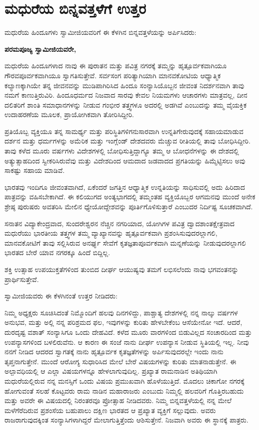 
\chapter{ಮಧುರೆಯ ಬಿನ್ನವತ್ತಳೆಗೆ ಉತ್ತರ}

ಮಧುರೆಯ ಹಿಂದೂಗಳು ಸ್ವಾಮೀಜಿಯವರಿಗೆ ಈ ಕೆಳಗಿನ ಬಿನ್ನವತ್ತಳೆಯನ್ನು ಅರ್ಪಿಸಿದರು:

\textbf{ಪರಮಪೂಜ್ಯ ಸ್ವಾಮೀಜಿಯವರೇ, }

ಮಧುರೆಯ ಹಿಂದೂಗಳಾದ ನಾವು ಈ ಪುರಾತನ ಮತ್ತು ಪವಿತ್ರ ನಗರಕ್ಕೆ ತಮ್ಮನ್ನು ಹೃತ್ಪೂರ್ವಕವಾಗಿಯೂ ಗೌರವಪೂರ್ವಕವಾಗಿಯೂ ಸ್ವಾಗತಿಸುತ್ತೇವೆ. ಸರ್ವಸಂಗ ಪರಿತ್ಯಾಗಿಯಾಗಿ ಮಾನವಕೋಟಿಯ ಆಧ್ಯಾತ್ಮಿಕ ಕಲ್ಯಾಣಕ್ಕಾಗಿಯೇ ತನ್ನ ಜೀವನವನ್ನು ಮುಡಿಪಾಗಿರಿಸಿದ ಹಿಂದೂ ಸಂನ್ಯಾಸಿಯೊಬ್ಬನ ಜೀವಂತ ನಿದರ್ಶನವಾಗಿ ತಾವು ನಮಗೆ ಕಾಣುತ್ತಿರುವಿರಿ. ಹಿಂದೂಧರ್ಮದ ನಿಜವಾದ ಸಾರವು ಕೇವಲ ನಿಯಮಗಳು ಆಚಾರಗಳು ಮಾತ್ರವಲ್ಲ, ದೀನ ದಲಿತರಿಗೆ ಶಾಂತಿ ಸಮಾಧಾನಗಳನ್ನು ನೀಡುವ ಗಂಭೀರ ತತ್ತ್ವಗಳೂ ಅದರಲ್ಲಿ ಅಡಗಿವೆ ಎಂಬುದನ್ನು ತಮ್ಮ ವೈಯಕ್ತಿಕ ಉದಾಹರಣೆಯ ಮೂಲಕ, ಪ್ರಾಯೋಗಿಕವಾಗಿ ತೋರಿಸಿದ್ದೀರಿ. 

ಪ್ರತಿಯೊಬ್ಬ ವ್ಯಕ್ತಿಯೂ ತನ್ನ ಸಾಮರ್ಥ್ಯ ಮತ್ತು ಪರಿಸ್ಥಿತಿಗಳಿಗನುಸಾರವಾಗಿ ಉನ್ನತಿಗೇರುವುದಕ್ಕೆ ಸಹಾಯಮಾಡುವ ದರ್ಶನ ಮತ್ತು ಧರ್ಮಗಳನ್ನು ಅಮೆರಿಕ ಮತ್ತು ಇಂಗ್ಲೆಂಡ್​ ದೇಶದವರು ಮೆಚ್ಚುವ ರೀತಿಯಲ್ಲಿ ತಾವು ಬೋಧಿಸಿದ್ದೀರಿ. ತಾವು ಕಳೆದ ಮೂರು ವರ್ಷಗಳು ವಿದೇಶಗಳಲ್ಲಿ ಬೋಧಿಸುತ್ತಿದ್ದಾಗ್ಯೂ ತಮ್ಮ ಆ ಬೋಧನೆ\-ಗಳನ್ನು ಈ ದೇಶದಲ್ಲಿ ಅತ್ಯುತ್ಸಾಹದಿಂದ ಸ್ವೀಕರಿಸಿರುವೆವು ಮತ್ತು ವಿದೇಶದಿಂದ ಆಮದಾದ ಜಡವಾದದ ಪ್ರಗತಿಯನ್ನು ಹಿಮ್ಮೆಟ್ಟಿಸಲು ಅವು ಸಾಕಷ್ಟು ಸಹಾಯ ಮಾಡಿವೆ. 

ಭಾರತವು ಇಂದಿಗೂ ಜೀವಂತವಾಗಿದೆ, ಏಕೆಂದರೆ ಜಗತ್ತಿನ ಆಧ್ಯಾತ್ಮಿಕ ಉನ್ನತಿಯನ್ನು ಸಾಧಿಸುವಲ್ಲಿ ಅದು ಹಿರಿದಾದ ಪಾತ್ರವನ್ನು ವಹಿಸಬೇಕಾಗಿದೆ. ಈ ಕಲಿಯುಗದ ಅಂತ್ಯಭಾಗದಲ್ಲಿ ತಮ್ಮಂತಹ ವ್ಯಕ್ತಿಯೊಬ್ಬರ ಆಗಮನವು ಮುಂದೆ ಅನೇಕ ಶ್ರೇಷ್ಠ ಪುರುಷರು ಅವತರಿಸಿ ಮೇಲಿನ ಧ್ಯೇಯೋದ್ದೇಶವನ್ನು ಪೂರ್ತಿಗೊಳಿಸುತ್ತಾರೆ ಎಂಬುದರ ನಿರ್ದಿಷ್ಟ ಸೂಚಕವಾಗಿದೆ. 

ಸನಾತನ ವಿದ್ಯಾಕೇಂದ್ರವಾದ, ಸುಂದರೇಶ್ವರನ ನೆಚ್ಚಿನ ನಗರಿಯಾದ, ಯೋಗಿಗಳ ಪವಿತ್ರ ದ್ವಾದಶಾಂತಕ್ಷೇತ್ರವಾದ ಮಧುರೆಯು ಭಾರತೀಯ ತತ್ತ್ವಗಳ ತಮ್ಮ ವ್ಯಾಖ್ಯಾನವನ್ನು ಹೃತ್ಪೂರ್ವಕವಾಗಿ ಪ್ರಶಂಸಿಸುವುದರಲ್ಲಾಗಲಿ, ಮಾನವಕೋಟಿಗೆ ತಾವು ಸಲ್ಲಿಸಿರುವ ಅನರ್ಘ್ಯ ಸೇವೆಗೆ ಕೃತಜ್ಞತಾಪೂರ್ವಕವಾಗಿ ಮನ್ನಣೆಯನ್ನು ನೀಡುವುದರಲ್ಲಾಗಲಿ ಭಾರತದ ಬೇರೆ ಯಾವ ನಗರಕ್ಕೂ ಹಿಂದೆ ಬಿದ್ದಿಲ್ಲ. 

ಶಕ್ತಿ ಉತ್ಸಾಹ ಉಪಯುಕ್ತತೆಗಳಿಂದ ತುಂಬಿದ ದೀರ್ಘ ಆಯುಷ್ಯವು ತಮಗೆ ಲಭಿಸಲೆಂದು ನಾವು ಭಗವಂತನನ್ನು ಪ್ರಾರ್ಥಿಸುತ್ತೇವೆ. 

ಸ್ವಾಮೀಜಿಯವರು ಈ ಕೆಳಗಿನಂತೆ ಉತ್ತರ ನೀಡಿದರು:

ನಿಮ್ಮ ಅಧ್ಯಕ್ಷರು ಸೂಚಿಸಿದಂತೆ ನಿಮ್ಮೊಂದಿಗೆ ಹಲವು ದಿನಗಳಿದ್ದು, ಪಾಶ್ಚಾತ್ಯ ದೇಶಗಳಲ್ಲಿ ನನ್ನ ನಾಲ್ಕು ವರ್ಷಗಳ ಅನುಭವ, ಮತ್ತು ಅಲ್ಲಿ ನನ್ನ ಪರಿಶ್ರಮದ ಫಲ, ಇವುಗಳನ್ನು ಕುರಿತು ಹೇಳಬೇಕೆಂಬ ಆಸೆಯೇನೋ ಇದೆ. ಆದರೆ, ದುರದೃಷ್ಟ ವಶಾತ್​ ಸಂನ್ಯಾಸಿಗೂ ಒಂದು ದೇಹವಿದೆ. ಕಳೆದ ಮೂರು ವಾರಗಳಿಂದ ಬಿಡುವಿಲ್ಲದ ಸಂಚಾರದಿಂದ ಮತ್ತು ಉಪನ್ಯಾಸಗಳಿಂದ ಬಳಲಿರುವೆನು. ಆ ಕಾರಣ ಈ ಸಂಜೆ ನಾನು ದೀರ್ಘ ಉಪನ್ಯಾಸ ನೀಡುವ ಸ್ಥಿತಿಯಲ್ಲಿ ಇಲ್ಲ. ನೀವು ನನಗೆ ನೀಡಿದ ಆದರದ ಸ್ವಾಗತಕ್ಕೆ ನಾನು ಹೃತ್ಪೂರ್ವಕ ಕೃತಜ್ಞತೆಗಳನ್ನು ಅರ್ಪಿಸುವುದರಲ್ಲೇ ಇಂದು ನಾನು ತೃಪ್ತನಾಗುತ್ತೇನೆ. ಮುಂದೆ ಆರೋಗ್ಯ ಸುಧಾರಿಸಿದ ಮೇಲೆ ಬೇರೆ ವಿಷಯಗಳನ್ನು ಕುರಿತು ಮಾತನಾಡುತ್ತೇನೆ. ಈ ಅಲ್ಪಾವಧಿಯಲ್ಲಿ ಆ ಎಲ್ಲಾ ವಿಷಯಗಳನ್ನೂ ಹೇಳಲಾಗುವುದಿಲ್ಲ. ಪ್ರಖ್ಯಾತ ರಾಮನಾಡಿನ ಅತಿಥಿಯಾಗಿ ಮಧುರೆಯಲ್ಲಿರುವ ನನ್ನ ಮನಸ್ಸಿಗೆ ಒಂದು ವಿಷಯ ಪ್ರಮುಖವಾಗಿ ಹೊಳೆಯುತ್ತಿದೆ. ಮೊದಲು ಚಿಕಾಗೋ ನಗರಕ್ಕೆ ಹೋಗುವಂತೆ ಸಲಹೆ ಕೊಟ್ಟವರು ರಾಮ ನಾಡಿನ ಮಹಾರಾಜರು ಎಂಬುದು ನಿಮ್ಮಲ್ಲಿ ಹಲವರಿಗೆ ಗೊತ್ತಿರಬಹುದು ಮತ್ತು ಅವರೇ ಈ ವಿಷಯದಲ್ಲಿ ನಿರಂತರವೂ ಪ್ರೋತ್ಸಾಹ ನೀಡಿದವರು. ನಿಮ್ಮ ಬಿನ್ನವತ್ತಳೆ\-ಯಲ್ಲಿ ನನ್ನ ಮೇಲೆ ಮಳೆಗೆರೆದಿರುವ ಪ್ರಶಂಸೆಯ ಬಹುಪಾಲು ದಕ್ಷಿಣ ಭಾರತದ ಆ ಪ್ರಖ್ಯಾತ ವ್ಯಕ್ತಿಗೆ ಸಲ್ಲುವುದು. ಅವರು ರಾಜರಾಗುವುದಕ್ಕಿಂತ ಸಂನ್ಯಾಸಿಗಳಾಗಿದ್ದರೆ ಮೇಲಾಗುತ್ತಿತ್ತೆಂದು ಆಶಿಸುತ್ತೇನೆ. ನಿಜವಾಗಿ ಅವರು ಈ ಸ್ಥಾನಕ್ಕೆ ಪಾತ್ರರು. 

